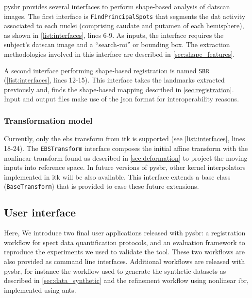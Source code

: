 \documentclass{frontiers}
\begin{document}
\Gls*{pysbr} provides several interfaces to perform shape-based analysis of \gls*{datscan}
  images.
The first interface is \texttt{FindPrincipalSpots} that segments the \acrlong*{dat} activity
  associated to each nuclei (comprising caudate and putamen of each hemisphere),
  as shown in \autoref{list:interfaces}, lines 6-9.
As inputs, the interface requires the subject's \gls*{datscan} image and a ``search-\gls*{roi}'' or
  bounding box.
The extraction methodologies involved in this interface are described in \autoref{sec:shape_features}.

A second interface performing shape-based registration is named \texttt{SBR}
  (\autoref{list:interfaces}, lines 12-15).
This interface takes the landmarks extracted previously and, finds
  the shape-based mapping described in \autoref{sec:registration}.
Input and output files make use of the \gls*{json} format
  for interoperability reasons.

\subsubsection{Transformation model} %
Currently, only the \gls*{ebs} transform from \gls*{itk} is supported
  (see \autoref{list:interfaces}, lines 18-24).
The \texttt{EBSTransform} interface composes the initial affine transform
  with the nonlinear transform found as described in \autoref{sec:deformation}
  to project the moving inputs into reference space.
In future versions of \gls*{pysbr}, other kernel interpolators implemented in \gls*{itk} 
  will be also available.
This interface extends a base class (\texttt{BaseTransform}) that is provided to
  ease these future extensions.


\subsection{User interface}
\label{sec:user_interface}

Here, We introduce two final user
  applications released with \gls*{pysbr}: a registration workflow for
  \gls*{spect} data quantification protocols, and an evaluation framework
  to reproduce the experiments we used to validate the tool.
These two workflows are also provided as command line interfaces.
Additional workflows are released with \gls*{pysbr}, for instance
  the workflow used to generate the synthetic datasets as described
  in \autoref{sec:data_synthetic} and the refinement workflow using
  nonlinear \gls*{ibr}, implemented using \gls*{ants}.
\end{document}
